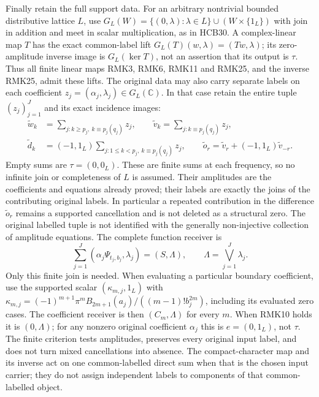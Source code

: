 Finally retain the full support data. For an arbitrary nontrivial
bounded distributive lattice $L$, use
$G_L(W)=\{(0,\lambda):\lambda\in L\}\cup(W\times\{1_L\})$
with join in addition and meet in scalar multiplication, as in
HCB30. A complex-linear map $T$ has the exact common-label lift
$G_L(T)(w,\lambda)=(Tw,\lambda)$; its zero-amplitude inverse image
is $G_L(\ker T)$, not an assertion that its output is $\tau$.
Thus all finite linear maps RMK3, RMK6, RMK11 and RMK25, and
the inverse RMK25, admit these lifts. The original data may also
carry separate labels on each coefficient
$z_j=(\alpha_j,\lambda_j)\in G_L(\mathbb C)$. In that case retain
the entire tuple $(z_j)_{j=1}^J$ and its exact incidence images:
\begin{equation}\tag{RMK30}
\begin{split}
 \widetilde w_k&=\sum_{j:k\geq p_j,\ k\equiv p_j(q_j)}z_j,\qquad
 \widetilde v_k=\sum_{j:k\equiv p_j(q_j)}z_j,\\
 \widetilde d_k&=(-1,1_L)
                  \sum_{j:1\leq k<p_j,\ k\equiv p_j(q_j)}z_j,\qquad
 \widetilde o_r=\widetilde v_r+(-1,1_L)\widetilde v_{-r}.
\end{split}
\end{equation}
Empty sums are $\tau=(0,0_L)$. These are finite sums at each
frequency, so no infinite join or completeness of $L$ is assumed.
Their amplitudes are the coefficients and equations already proved;
their labels are exactly the joins of the contributing original
labels. In particular a repeated contribution in the difference
$\widetilde o_r$ remains a supported cancellation and is not
deleted as a structural zero. The original labelled tuple is not
identified with the generally non-injective collection of amplitude
equations. The complete function receiver is
\begin{equation}\tag{RMK31}
 \sum_{j=1}^J(\alpha_j\Psi_{t_j,b_j},\lambda_j)
      =(S,\Lambda),\qquad \Lambda=\bigvee_{j=1}^J\lambda_j.
\end{equation}
Only this finite join is needed. When evaluating a particular
boundary coefficient, use the supported scalar
$(\kappa_{m,j},1_L)$ with
$\kappa_{m,j}=(-1)^{m+1}\pi^mB_{2m+1}(a_j)/((m-1)!b_j^{2m})$,
including its evaluated zero cases. The coefficient receiver is
then $(C_m,\Lambda)$ for every $m$. When RMK10 holds it is
$(0,\Lambda)$; for any nonzero original coefficient $\alpha_j$
this is $e=(0,1_L)$, not $\tau$. The finite criterion tests
amplitudes, preserves every original input label, and does not
turn mixed cancellations into absence. The compact-character map
and its inverse act on one common-labelled direct sum when that
is the chosen input carrier; they do not assign independent
labels to components of that common-labelled object.


